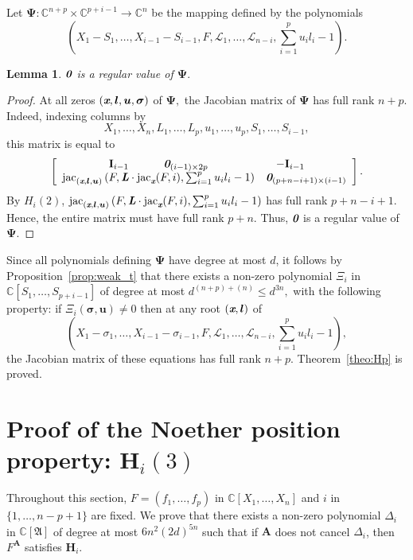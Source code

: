 \documentclass[a4paper]{article}
\def\sL{\mathscr{L}}
\def\A{\mathfrak{A}}
\def\bz{\textit{\textbf{0}}}
\def\Lb{\textit{\textbf{L}}}
\def\mA{{\bm A}}
\def\ub{{\bm u}}
\def\lb{{\bm l}}
\def\xb{\textit{\textbf{x}}}
\def\bI{\textbf{I}}
\def\D{\Delta}
\DeclareMathOperator{\jac}{jac}
\def\C{\mathbb{C}}
\def\udl{\sum_{i=1}^pu_il_i}
\newtheorem{lemma}[theorem]{Lemma}
\begin{document}
\smallskip

Let $\bm\Psi: \C^{n+p} \times \C^{p+i-1} \rightarrow \C^{n}$ be the mapping defined by the polynomials
\[
  \left(X_1-S_1,\dots,X_{i-1}-S_{i-1},F,\sL_1,\hdots,\sL_{n-i},\udl-1\right).
\]
%
\begin{lemma}
  $\bz$ is a regular value of $\bm\Psi.$
\end{lemma}
\begin{proof}
At all zeros $(\xb,\lb,\ub,\bm \sigma)$ of $\bm\Psi,$ the Jacobian matrix of
$\bm\Psi$ has full rank $n+p$. Indeed, indexing columns 
    by 
    \[
    X_1,\dots,X_n,L_1,\hdots,L_p,u_1,\hdots,u_p,S_1,\dots,S_{i-1},
    \]
    this matrix is equal to
    \[
    \left[ 
    \begin{array}{ccc}
    \bI_{i-1}\hspace{11mm} \bz_{(i-1)\times 2p}&\hspace{-10mm}-\bI_{i-1}\\
    \jac_{(\xb,\bm l,\bm u)}\left( F,\Lb \cdot \jac_{\xb} (F,i),\udl-1  \right)&\bz_{(p+n-i+1)\times (i-1)}
    \end{array}
    \right].
    \]
    By $H_i(2)$, $\jac_{(\xb,\bm l,\bm u)}\left( F,\Lb \cdot \jac_{\xb} (F,i), \udl-1 \right)$ has full rank $p+n-i+1$. Hence, the entire    
    matrix must have full rank $p+n$. Thus,  $\bz$ is a regular value of $\bm\Psi.$
    \end{proof}

Since all polynomials defining $\bm\Psi$ have degree at most $d$, it
follows by Proposition~\ref{prop:weak_t} that there exists a non-zero
polynomial $\Xi_i$ in $\C[S_1,\dots,S_{p+i-1}]$ of degree at most
$d^{(n+p)+(n)}\leq d^{3n},$ with the following property:  if $\Xi_i(\bm \sigma, \ub)\neq 0$ then at any root $(\xb,\lb)$ of
\[
\left(X_1-\sigma_1,\dots,X_{i-1}-\sigma_{i-1},F,\sL_1,\hdots,\sL_{n-i},\udl-1\right),
\] 
  the Jacobian matrix of these
equations has full rank $n+p$. Theorem~\ref{theo:Hp} is proved.




\section{Proof of the Noether position property: $\textbf{H}_i(3)$}\label{ssec:Hi2}
Throughout this section, $F = (f_1,\hdots,f_p)$ in $\C[X_1,\hdots,X_n]$ and $i$ in $\{1,\hdots,n-p+1\}$ are fixed. We prove that there exists a non-zero polynomial $\D_{i}$ in $\C[\A]$ of degree at most $6n^2(2d)^{5n}$ such that if $\mA$ does not cancel $\D_{i}$, then $F^{\mA}$ satisfies  $\textbf{H}_i$.
\end{document}
